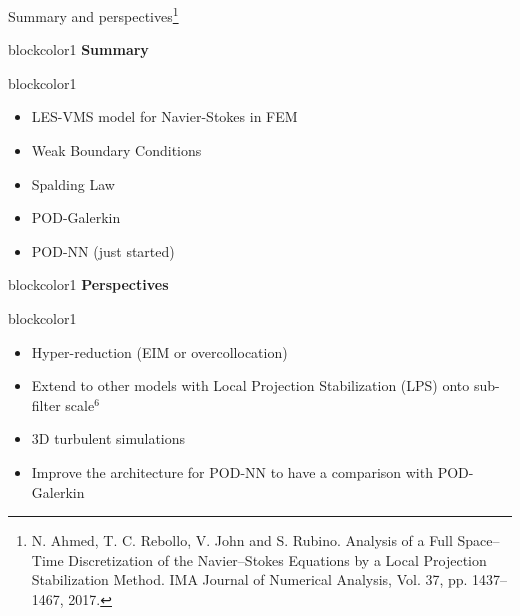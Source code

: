 \documentclass[9pt,compress,t,aspectratio=169]{beamer}
\newcommand{\1}{\begin{pmatrix}
		1\\
		1
\end{pmatrix}}
\newcommand{\highlight}[1]{\textbf{\color{bluemathlab}#1}}
\begin{document}
\begin{frame}[c]{Summary and perspectives\footnote{N. Ahmed, T. C. Rebollo, V. John and S. Rubino. Analysis of a Full Space–Time Discretization of the Navier–Stokes Equations by a Local Projection Stabilization Method. IMA Journal of Numerical Analysis, Vol. 37, pp. 1437–1467, 2017.}}
	\begin{minipage}[t]{0.49\textwidth}
		\begin{beamercolorbox}[sep=0.5em,wd=\textwidth]{blockcolor1}
				\centering
			\highlight{\LARGE Summary}
		\end{beamercolorbox}
		\begin{beamercolorbox}[sep=0.5em,wd=\textwidth]{blockcolor1}
			\Large
			\begin{itemize}
				\item LES-VMS model for Navier-Stokes in FEM
				\item Weak Boundary Conditions
				\item Spalding Law
				\item POD-Galerkin
				\item POD-NN (just started)
			\end{itemize}
				
		\end{beamercolorbox}
	\end{minipage}
	\begin{minipage}[t]{0.49\textwidth}
	\begin{beamercolorbox}[sep=0.5em,wd=\textwidth]{blockcolor1}
		\centering
		\highlight{\LARGE Perspectives}
	\end{beamercolorbox}
	\begin{beamercolorbox}[sep=0.5em,wd=\textwidth]{blockcolor1}
		\Large
		\begin{itemize}
			\item Hyper-reduction (EIM or overcollocation)
			\item Extend to other models with Local Projection Stabilization (LPS) onto sub-filter scale$^6$
			\item 3D turbulent simulations
			\item Improve the architecture for POD-NN to have a comparison with POD-Galerkin
		\end{itemize}
		
	\end{beamercolorbox}
\end{minipage}

\end{frame}
\end{document}
